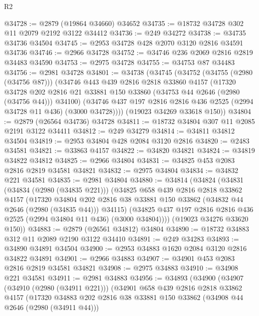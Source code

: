\begin{lexlean}{R2}
\begin{coremodule}
@34728 := @2879 (@19864 @34660) @34652
@34735 := @18732 @34728 @302 @11 @2079 @2192 @3122 @34412
@34736 := @249 @34272
@34738 := @34735 @34736 @34504
@34745 := @2953 @34728 @428 @2070 @3120 @2816 @34591 @34736
@34746 := @2966 @34728
@34752 := @34746 @236 @2069 @2816 @2819 @34483 @34590
@34753 := @2975 @34728
@34755 := @34753 @87 @34483
@34756 := @2981 @34728
@34801 := @34738
    (@34745
      (@34752
        (@34755 (@2980 (@34756 @87)))
        (@34746
          @443
          @439
          @2816
          @2818
          @33860
          @4157
          (@17320
            @34728
            @202
            @2816
            @21
            @33881
            @150
            @33860
            (@34753 @44 @2646 (@2980 (@34756 @44)))
            @34100)
          (@34746 @437 @197 @2816 @2816 @436 @2525 (@2994 @34728 @11 @436) (@3000 @34728))))
      (@19023 @34269 @33618 @150))
@34804 := @2879 (@26564 @34736) @34728
@34811 := @18732 @34804 @307 @11 @2085 @2191 @3122 @34411
@34812 := @249 @34279
@34814 := @34811 @34812 @34504
@34819 := @2953 @34804 @428 @2084 @3120 @2816
@34820 := @2483 @34581
@34821 := @33863 @4157
@34822 := @34820 @34821
@34824 := @34819 @34822 @34812
@34825 := @2966 @34804
@34831 := @34825 @453 @2083 @2816 @2819 @34581 @34821
@34832 := @2975 @34804
@34834 := @34832 @221 @34581
@34835 := @2981 @34804
@34880 := @34814
    (@34824
      (@34831
        (@34834 (@2980 (@34835 @221)))
        (@34825
          @658
          @439
          @2816
          @2818
          @33862
          @4157
          (@17320
            @34804
            @202
            @2816
            @38
            @33881
            @150
            @33862
            (@34832 @44 @2646 (@2980 (@34835 @44)))
            @34115)
          (@34825 @437 @197 @2816 @2816 @436 @2525 (@2994 @34804 @11 @436) (@3000 @34804))))
      (@19023 @34276 @33620 @150))
@34883 := @2879 (@26561 @34812) @34804
@34890 := @18732 @34883 @312 @11 @2089 @2190 @3122 @34410
@34891 := @249 @34283
@34893 := @34890 @34891 @34504
@34900 := @2953 @34883 @1620 @2084 @3120 @2816 @34822 @34891
@34901 := @2966 @34883
@34907 := @34901 @453 @2083 @2816 @2819 @34581 @34821
@34908 := @2975 @34883
@34910 := @34908 @221 @34581
@34911 := @2981 @34883
@34956 := @34893
    (@34900
      (@34907
        (@34910 (@2980 (@34911 @221)))
        (@34901
          @658
          @439
          @2816
          @2818
          @33862
          @4157
          (@17320
            @34883
            @202
            @2816
            @38
            @33881
            @150
            @33862
            (@34908 @44 @2646 (@2980 (@34911 @44)))

\end{coremodule}
\end{lexlean}
